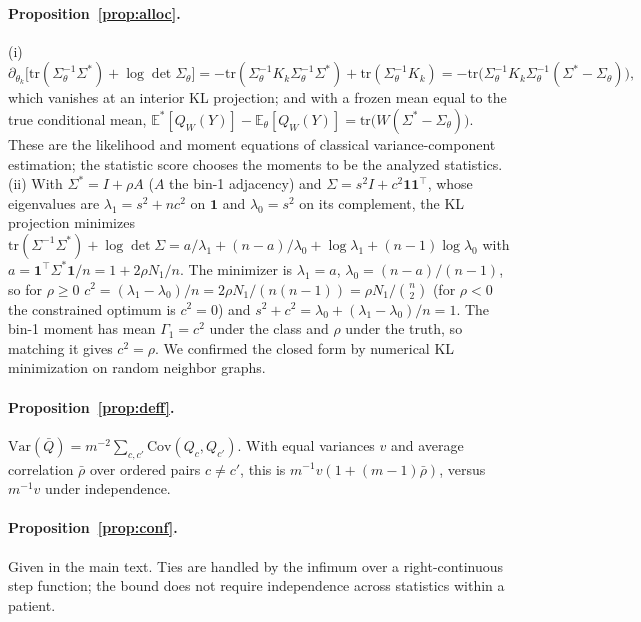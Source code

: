 \documentclass[10pt,letterpaper]{article}
\theoremstyle{definition}
\theoremstyle{remark}
\newcommand{\E}{\mathbb{E}}
\newcommand{\Var}{\mathrm{Var}}
\newcommand{\Cov}{\mathrm{Cov}}
\begin{document}
\paragraph{Proposition~\ref{prop:alloc}.} (i) \[\partial_{\theta_k}\big[\mathrm{tr}(\Sigma_\theta^{-1}\Sigma^*)+\log\det\Sigma_\theta\big]=-\mathrm{tr}(\Sigma_\theta^{-1}K_k\Sigma_\theta^{-1}\Sigma^*)+\mathrm{tr}(\Sigma_\theta^{-1}K_k)=-\mathrm{tr}\big(\Sigma_\theta^{-1}K_k\Sigma_\theta^{-1}(\Sigma^*-\Sigma_\theta)\big),\] which vanishes at an interior KL projection; and with a frozen mean equal to the true conditional mean, $\E^*[Q_{W}(Y)]-\E_\theta[Q_{W}(Y)]=\mathrm{tr}\big(W(\Sigma^*-\Sigma_\theta)\big)$. These are the likelihood and moment equations of classical variance-component estimation; the statistic score chooses the moments to be the analyzed statistics. (ii) With $\Sigma^*=I+\rho A$ ($A$ the bin-1 adjacency) and $\Sigma=s^2I+c^2\mathbf{1}\mathbf{1}^\top$, whose eigenvalues are $\lambda_1=s^2+nc^2$ on $\mathbf{1}$ and $\lambda_0=s^2$ on its complement, the KL projection minimizes $\mathrm{tr}(\Sigma^{-1}\Sigma^*)+\log\det\Sigma=a/\lambda_1+(n-a)/\lambda_0+\log\lambda_1+(n-1)\log\lambda_0$ with $a=\mathbf{1}^\top\Sigma^*\mathbf{1}/n=1+2\rho N_1/n$. The minimizer is $\lambda_1=a$, $\lambda_0=(n-a)/(n-1)$, so for $\rho\ge0$ $c^2=(\lambda_1-\lambda_0)/n=2\rho N_1/(n(n-1))=\rho N_1/\binom n2$ (for $\rho<0$ the constrained optimum is $c^2=0$) and $s^2+c^2=\lambda_0+(\lambda_1-\lambda_0)/n=1$. The bin-1 moment has mean $\Gamma_1=c^2$ under the class and $\rho$ under the truth, so matching it gives $c^2=\rho$. We confirmed the closed form by numerical KL minimization on random neighbor graphs.

\paragraph{Proposition~\ref{prop:deff}.} $\Var(\bar Q)=m^{-2}\sum_{c,c'}\Cov(Q_c,Q_{c'})$. With equal variances $v$ and average correlation $\bar\rho$ over ordered pairs $c\ne c'$, this is $m^{-1}v(1+(m-1)\bar\rho)$, versus $m^{-1}v$ under independence.

\paragraph{Proposition~\ref{prop:conf}.} Given in the main text. Ties are handled by the infimum over a right-continuous step function; the bound does not require independence across statistics within a patient.

\begin{table}[htp]
\centering
\caption{Reference patient roles: four-run aggregate versus the direct reseed mean on 40 ORION patients. Each metric averages the per-run patient-MSE ratio; this is not prediction ensembling. LIGATURE uses the reference plus three current-code reseeds; direct prediction uses three seeds. Brackets are 95\% patient-bootstrap intervals conditional on fitted models (2,000 replicates); the final row is a paired difference, with positive values favoring direct prediction.}
\label{tab:primaryseeds}

\end{table}
\end{document}
